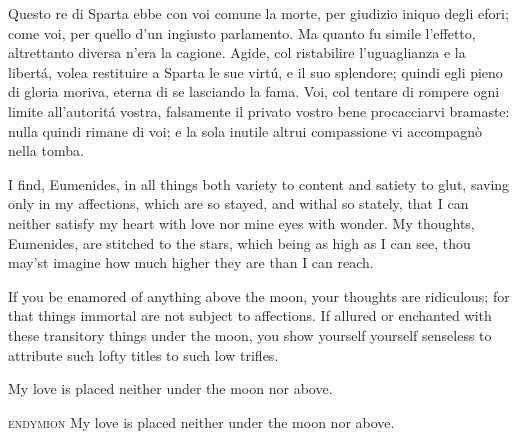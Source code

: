 \documentclass[a5paper,11pt]{memoir}
\def\testodicontrollo{%
Questo re di Sparta ebbe con voi comune la morte, per giudizio
iniquo degli efori; come voi, per quello d'un ingiusto parlamento.
Ma quanto fu simile l'effetto, altrettanto diversa n'era la
cagione. Agide, col ristabilire l'uguaglianza e la libertá, volea
restituire a Sparta le sue virtú, e il suo splendore; quindi egli
pieno di gloria moriva, eterna di se lasciando la fama. Voi, col
tentare di rompere ogni limite all'autoritá vostra, falsamente il
privato vostro bene procacciarvi bramaste: nulla quindi rimane di
voi; e la sola inutile altrui compassione vi accompagnò nella
tomba.
}
\begin{document}
\testodicontrollo

\begin{drama}
 I find, Eumenides, in all things both variety to
content and satiety to glut, saving only in my affections,
which are so stayed, and withal so stately, that I can
neither satisfy my heart with love nor mine eyes with
wonder. My thoughts, Eumenides, are stitched to the
stars, which being as high as I can see, thou may'st
imagine how much higher they are than I can reach.

 If you be enamored of anything above the
moon, your thoughts are ridiculous; for that things immortal
are not subject to affections. If allured or enchanted with
these transitory things under the moon, you show yourself
yourself senseless to attribute such lofty titles to such low
trifles.

 My love is placed neither under the moon nor
above.

\item[\scshape endymion] My love is placed neither under the moon nor
above.
\end{drama}
\end{document}
